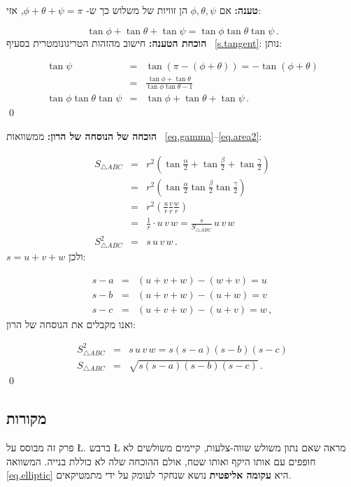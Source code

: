 \textbf{טענה:}
אם 
$\phi,\theta,\psi$
הן זוויות של משלוש כך ש-%
$\phi+\theta+\psi=\pi$,
אזי:




\begin{equation}
\tan\phi+\tan\theta+\tan\psi = \tan\phi\tan\theta\tan\psi\,. \label{eq.triple}
\end{equation}
\textbf{הוכחת הטענה:}
חישוב מהזהות הטריגונומטרית בסעיף~%
\ref{s.tangent}:
נותן:




\begin{eqnarray*}
\tan\psi &=& \tan (\pi-(\phi+\theta))= -\tan (\phi+\theta)\\
&=& \frac{\tan\phi+\tan\theta}{\tan\phi\tan\theta-1}\\
\tan\phi\tan\theta\tan\psi &=&\tan\phi+\tan\theta+\tan\psi\,.
\end{eqnarray*}
\qed



\textbf{הוכחה של הנוסחה של הרון:}
ממשוואות 
~\ref{eq.gamma}--\ref{eq.area2}:




\begin{eqnarray*}
S_{\triangle ABC} &=& r^2\left(\tan \frac{\alpha}{2}+\tan \frac{\beta}{2}+\tan \frac{\gamma}{2}\right)\\
&=&r^2\left(\tan \frac{\alpha}{2}\tan \frac{\beta}{2}\tan \frac{\gamma}{2}\right)\\
&=&r^2\left(\frac{u}{r}\frac{v}{r}\frac{w}{r}\right)\\
&=&\frac{1}{r}\cdot u\,v\,w=\frac{s}{S_{\triangle ABC}}\,u\,v\,w\\
S_{\triangle ABC}^2&=&s\,u\,v\,w\,.
\end{eqnarray*}
$s=u+v+w$
ולכן:

\begin{eqnarray*}
s - a &=& (u+v+w) - (w+v) = u\\
s - b &=& (u+v+w) - (u+w) = v\\
s - c &=& (u+v+w) - (u+v) = w\,,
\end{eqnarray*}
ואנו מקבלים את הנוסחה של הרון:

\begin{eqnarray*}
S_{\triangle ABC}^2 &=& s\,u\,v\,w= s(s-a)(s-b)(s-c)\\
S_{\triangle ABC} &=& \sqrt{s(s-a)(s-b)(s-c)}\,.
\end{eqnarray*}
\qed




\subsection*{מקורות}

פרק זה מבוסס על 
\L{\cite{mccallum}}.
ברבש
\L{\cite{marita}}
מראה שאם נתון משולש שווה-צלעות, קיימים משולשים לא חופפים עם אותו היקף ואותו שטח, אולם ההוכחה שלה לא כוללת בנייה. 
המשוואה~%
\ref{eq.elliptic}
היא
\textbf{עקומה אליפטית}
נושא שנחקר לעומק על ידי מתמטיקאים.
